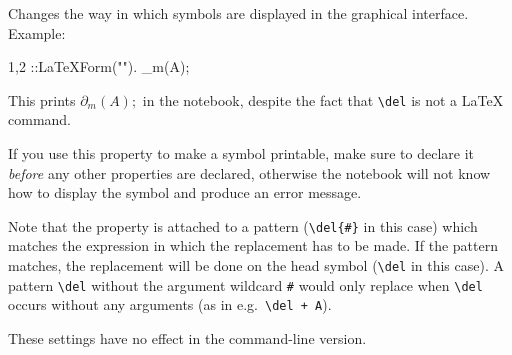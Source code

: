 
Changes the way in which symbols are displayed in the graphical
interface. Example:
\begin{screen}{1,2}
\del{#}::LaTeXForm("\partial").
\del_{m}(A);
\end{screen}
This prints $\partial_{m}(A);$ in the notebook, despite the fact
that \verb|\del| is not a \LaTeX{} command.

If you use this property to make a symbol printable, make sure to
declare it \emph{before} any other properties are declared, otherwise
the notebook will not know how to display the symbol and produce an
error message.

Note that the property is attached to a pattern (\verb|\del{#}| in
this case) which matches the expression in which the replacement has
to be made. If the pattern matches, the replacement will be done on
the head symbol (\verb|\del| in this case). A pattern \verb|\del|
without the argument wildcard \verb|#| would only replace
when \verb|\del| occurs without any arguments (as in 
e.g.~\verb|\del + A|).

These settings have no effect in the command-line version.

